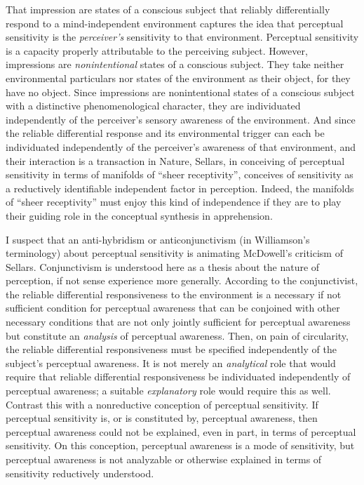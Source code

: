 \documentclass[12pt]{article}
\begin{document}
That impression are states of a conscious subject that reliably differentially respond to a mind-independent environment captures the idea that perceptual sensitivity is the \emph{perceiver's} sensitivity to that environment. Perceptual sensitivity is a capacity properly attributable to the perceiving subject. However, impressions are \emph{nonintentional} states of a conscious subject. They take neither environmental particulars nor states of the environment as their object, for they have no object. Since impressions are nonintentional states of a conscious subject with a distinctive phenomenological character, they are individuated independently of the perceiver's sensory awareness of the environment. And since the reliable differential response and its environmental trigger can each be individuated independently of the perceiver's awareness of that environment, and their interaction is a transaction in Nature, Sellars, in conceiving of perceptual sensitivity in terms of manifolds of ``sheer receptivity'', conceives of sensitivity as a reductively identifiable independent factor in perception. Indeed, the manifolds of ``sheer receptivity'' must enjoy this kind of independence if they are to play their guiding role in the conceptual synthesis in apprehension.

I suspect that an anti-hybridism or anticonjunctivism (in Williamson's \citeyear{Williamson:2000lr} terminology) about perceptual sensitivity is animating McDowell's criticism of Sellars. Conjunctivism is understood here as a thesis about the nature of perception, if not sense experience more generally. According to the conjunctivist, the reliable differential responsiveness to the environment is a necessary if not sufficient condition for perceptual awareness that can be conjoined with other necessary conditions that are not only jointly sufficient for perceptual awareness but constitute an \emph{analysis} of perceptual awareness. Then, on pain of circularity, the reliable differential responsiveness must be specified independently of the subject's perceptual awareness. It is not merely an \emph{analytical} role that would require that reliable differential responsiveness be individuated independently of perceptual awareness; a suitable \emph{explanatory} role would require this as well.  Contrast this with a nonreductive conception of perceptual sensitivity. If perceptual sensitivity is, or is constituted by, perceptual awareness, then perceptual awareness could not be explained, even in part, in terms of perceptual sensitivity. On this conception, perceptual awareness is a mode of sensitivity, but perceptual awareness is not analyzable or otherwise explained in terms of sensitivity reductively understood. 
\end{document}
